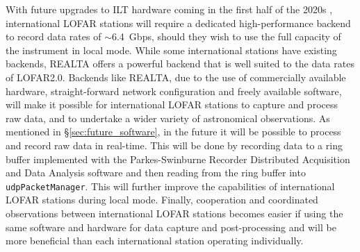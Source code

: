 With future upgrades to ILT hardware coming in the first half of the 2020s \citep[mainly, LOFAR2.0;][]{Edler2021}, international LOFAR stations will require a dedicated high-performance backend to record data rates of $\sim$6.4~Gbps, should they wish to use the full capacity of the instrument in local mode. While some international stations have existing backends, REALTA offers a powerful backend that is well suited to the data rates of LOFAR2.0. Backends like REALTA, due to the use of commercially available hardware, straight-forward network configuration and freely available software, will make it possible for international LOFAR stations to capture and process raw data, and to undertake a wider variety of astronomical observations. As mentioned in \S \ref{sec:future_software}, in the future it will be possible to process and record raw data in real-time. This will be done by recording data to a ring buffer implemented with the Parkes-Swinburne Recorder Distributed Acquisition and Data Analysis software \citep[PSRDADA;][]{PSRDADA} and then reading from the ring buffer into \texttt{udpPacketManager}. This will further improve the capabilities of international LOFAR stations during local mode. Finally, cooperation and coordinated observations between international LOFAR stations becomes easier if using the same software and hardware for data capture and post-processing and will be more beneficial than each international station operating individually.